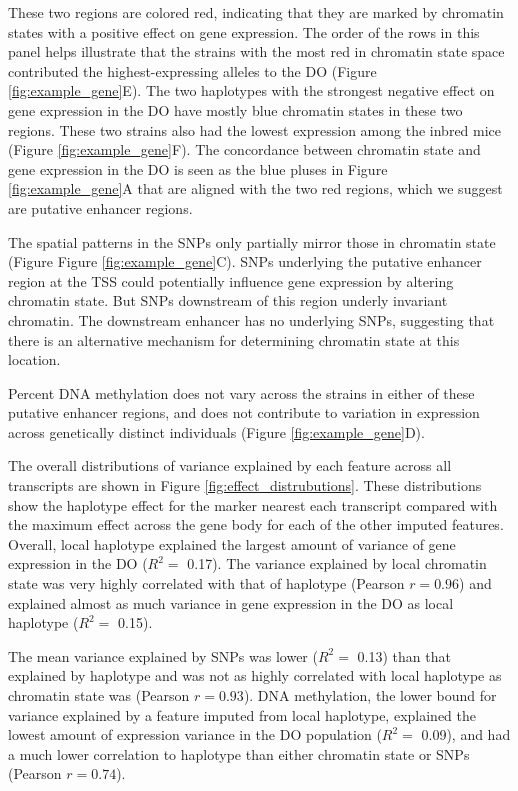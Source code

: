 \documentclass[10pt,letterpaper]{article}
\begin{document}
These two regions are colored red, indicating that they are marked by
chromatin states with a positive effect on gene expression. The order of
the rows in this panel helps illustrate that the strains with the most
red in chromatin state space contributed the highest-expressing alleles
to the DO (Figure \ref{fig:example_gene}E). The two haplotypes with the
strongest negative effect on gene expression in the DO have mostly blue
chromatin states in these two regions. These two strains also had the
lowest expression among the inbred mice (Figure
\ref{fig:example_gene}F). The concordance between chromatin state and
gene expression in the DO is seen as the blue pluses in Figure
\ref{fig:example_gene}A that are aligned with the two red regions, which
we suggest are putative enhancer regions.

The spatial patterns in the SNPs only partially mirror those in
chromatin state (Figure Figure \ref{fig:example_gene}C). SNPs underlying
the putative enhancer region at the TSS could potentially influence gene
expression by altering chromatin state. But SNPs downstream of this
region underly invariant chromatin. The downstream enhancer has no
underlying SNPs, suggesting that there is an alternative mechanism for
determining chromatin state at this location.

Percent DNA methylation does not vary across the strains in either of
these putative enhancer regions, and does not contribute to variation in
expression across genetically distinct individuals (Figure
\ref{fig:example_gene}D).

The overall distributions of variance explained by each feature across
all transcripts are shown in Figure \ref{fig:effect_distrubutions}.
These distributions show the haplotype effect for the marker nearest
each transcript compared with the maximum effect across the gene body
for each of the other imputed features. Overall, local haplotype
explained the largest amount of variance of gene expression in the DO
(\(R^2 =\) 0.17). The variance explained by local chromatin state was
very highly correlated with that of haplotype (Pearson \(r = 0.96\)) and
explained almost as much variance in gene expression in the DO as local
haplotype (\(R^2 =\) 0.15).

The mean variance explained by SNPs was lower (\(R^2 =\) 0.13) than that
explained by haplotype and was not as highly correlated with local
haplotype as chromatin state was (Pearson \(r = 0.93\)). DNA
methylation, the lower bound for variance explained by a feature imputed
from local haplotype, explained the lowest amount of expression variance
in the DO population (\(R^2 =\) 0.09), and had a much lower correlation
to haplotype than either chromatin state or SNPs (Pearson \(r = 0.74\)).
\end{document}
